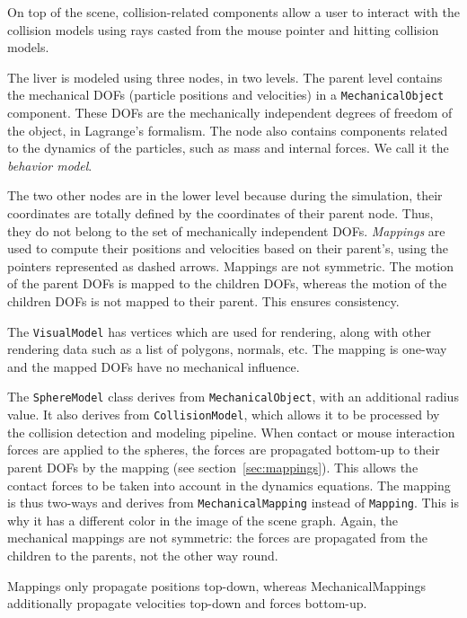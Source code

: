 On top of the scene, collision-related components allow a user to interact with the collision models using rays casted from the mouse pointer and hitting collision models. 

The liver is modeled using three nodes, in two levels. 
The parent level contains the mechanical DOFs (particle positions and velocities) in a \texttt{MechanicalObject} component. 
These DOFs are the mechanically independent degrees of freedom of the object, in Lagrange's formalism. 
The node also contains components related to the dynamics of the particles, such as mass and internal forces. 
We call it the \textit{behavior model}.

The two other nodes are in the lower level because during the simulation, their coordinates are totally defined by the coordinates of their parent node. 
Thus, they do not belong to the set of mechanically independent DOFs. 
\emph{Mappings} are used to compute their positions and velocities based on their parent's, using the pointers represented as dashed arrows. 
Mappings are not symmetric. 
The motion of the parent DOFs is mapped to the children DOFs, whereas the motion of the children DOFs is not mapped to their parent. 
This ensures consistency.

The \texttt{VisualModel} has vertices which are used for rendering, along with other rendering data such as a list of polygons, normals, etc. 
The mapping is one-way and the mapped DOFs have no mechanical influence.

The \texttt{SphereModel} class derives from \texttt{MechanicalObject}, with an additional radius value. 
It also derives from \texttt{CollisionModel}, which allows it to be processed by the collision detection and modeling pipeline. 
When contact or mouse interaction forces are applied to the spheres, the forces are propagated bottom-up to their parent DOFs by the mapping (see section~\ref{sec:mappings}). 
This allows the contact forces to be taken into account in the dynamics equations. 
The mapping is thus two-ways and derives from \texttt{MechanicalMapping} instead of \texttt{Mapping}. 
This is why it has a different color in the image of the scene graph.
Again, the mechanical mappings are not symmetric: the forces are propagated from the children to the parents, not the other way round.

Mappings only propagate positions top-down, whereas MechanicalMappings additionally propagate velocities top-down and forces bottom-up.

